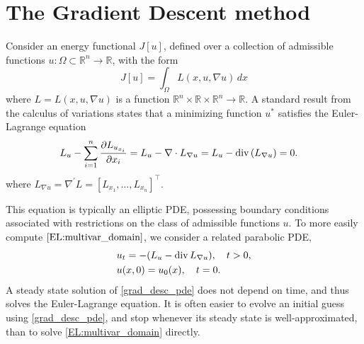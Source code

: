 \label{lab:tv_images}



\section*{The Gradient Descent method}
Consider an energy functional $J[u]$, defined over a collection of admissible functions $u:\Omega \subset \mathbb{R}^n \to \mathbb{R}$, with the form
\[J[u] = \int_{\Omega} L(x,u,\nabla u) \, dx\]
where $L = L(x,u,\nabla u)$ is a function $\mathbb{R}^n \times \mathbb{R} \times \mathbb{R}^n \to \mathbb{R}$.
A standard result from the calculus of variations states that a minimizing function $u^*$ satisfies the Euler-Lagrange equation
\begin{align}
L_u-\sum_{i=1}^n\frac{\partial L_{u_{x_i}}}{\partial x_i}=L_u-\nabla\cdot L_{\nabla u}=L_u - {\rm div}\,(L_{\nabla u}) &= 0.    \label{EL:multivar_domain}
\end{align}
where $L_{\nabla u} = \nabla^\prime L = [L_{x_1},\hdots,L_{x_n}]^\intercal$.

This equation is typically an elliptic PDE, possessing boundary conditions associated with  restrictions on the class of admissible functions $u$.
To more easily compute $\eqref{EL:multivar_domain}$, we consider a related parabolic PDE,
\begin{align}
    \begin{split}
    &{ } u_t = -(L_u - {\rm div}\, L_{\nabla u}), \quad t > 0,\\
    &{ } u(x,0) = u_0(x), \quad t = 0.
    \end{split} \label{grad_desc_pde}
\end{align}
A steady state solution of \eqref{grad_desc_pde} does not depend on time, and thus solves the Euler-Lagrange equation.
It is often easier to evolve an initial guess using \eqref{grad_desc_pde}, and stop whenever its steady state is well-approximated, than to solve \eqref{EL:multivar_domain} directly.

